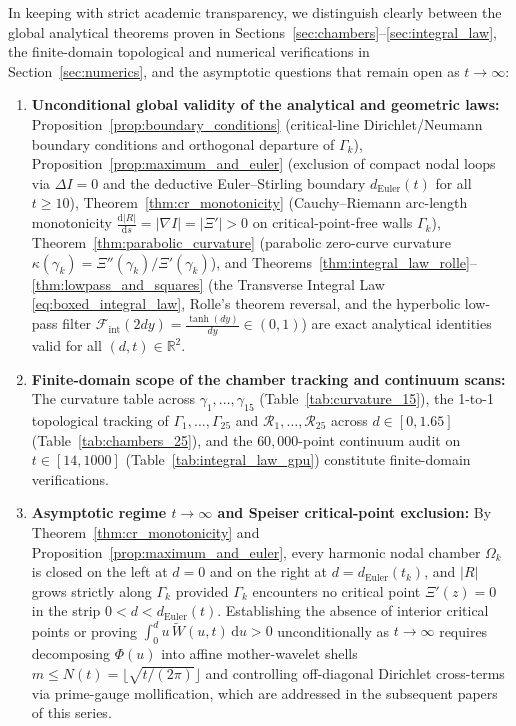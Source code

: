 \documentclass[11pt,a4paper,reqno]{amsart}
\theoremstyle{definition}
\theoremstyle{remark}
\numberwithin{equation}{section}
\newcommand{\dd}{\mathrm{d}}
\newcommand{\Wtil}{\widetilde{W}}
\newcommand{\Fint}{\mathcal{F}_{\mathrm{int}}}
\begin{document}
In keeping with strict academic transparency, we distinguish clearly between the global analytical theorems proven in Sections~\ref{sec:chambers}--\ref{sec:integral_law}, the finite-domain topological and numerical verifications in Section~\ref{sec:numerics}, and the asymptotic questions that remain open as $t \to \infty$:
\begin{enumerate}
\item \textbf{Unconditional global validity of the analytical and geometric laws:}
Proposition~\ref{prop:boundary_conditions} (critical-line Dirichlet/Neumann boundary conditions and orthogonal departure of $\Gamma_k$), Proposition~\ref{prop:maximum_and_euler} (exclusion of compact nodal loops via $\Delta I = 0$ and the deductive Euler--Stirling boundary $d_{\mathrm{Euler}}(t)$ for all $t \ge 10$), Theorem~\ref{thm:cr_monotonicity} (Cauchy--Riemann arc-length monotonicity $\frac{\dd|R|}{\dd s} = |\nabla I| = |\Xi'| > 0$ on critical-point-free walls $\Gamma_k$), Theorem~\ref{thm:parabolic_curvature} (parabolic zero-curve curvature $\kappa(\gamma_k) = \Xi''(\gamma_k)/\Xi'(\gamma_k)$), and Theorems~\ref{thm:integral_law_rolle}--\ref{thm:lowpass_and_squares} (the Transverse Integral Law \eqref{eq:boxed_integral_law}, Rolle's theorem reversal, and the hyperbolic low-pass filter $\Fint(2d y) = \frac{\tanh(d y)}{d y} \in (0,1)$) are exact analytical identities valid for all $(d,t) \in \mathbb{R}^2$.
\item \textbf{Finite-domain scope of the chamber tracking and continuum scans:}
The curvature table across $\gamma_1, \dots, \gamma_{15}$ (Table~\ref{tab:curvature_15}), the 1-to-1 topological tracking of $\Gamma_1, \dots, \Gamma_{25}$ and $\mathcal{R}_1, \dots, \mathcal{R}_{25}$ across $d \in [0, 1.65]$ (Table~\ref{tab:chambers_25}), and the $60{,}000$-point continuum audit on $t \in [14, 1000]$ (Table~\ref{tab:integral_law_gpu}) constitute finite-domain verifications.
\item \textbf{Asymptotic regime $t \to \infty$ and Speiser critical-point exclusion:}
By Theorem~\ref{thm:cr_monotonicity} and Proposition~\ref{prop:maximum_and_euler}, every harmonic nodal chamber $\Omega_k$ is closed on the left at $d = 0$ and on the right at $d = d_{\mathrm{Euler}}(t_k)$, and $|R|$ grows strictly along $\Gamma_k$ provided $\Gamma_k$ encounters no critical point $\Xi'(z) = 0$ in the strip $0 < d < d_{\mathrm{Euler}}(t)$. Establishing the absence of interior critical points or proving $\int_0^d u\,\Wtil(u,t)\,\dd u > 0$ unconditionally as $t \to \infty$ requires decomposing $\Phi(u)$ into affine mother-wavelet shells $m \le N(t) = \lfloor\sqrt{t/(2\pi)}\rfloor$ and controlling off-diagonal Dirichlet cross-terms via prime-gauge mollification, which are addressed in the subsequent papers of this series.
\end{enumerate}
\end{document}
